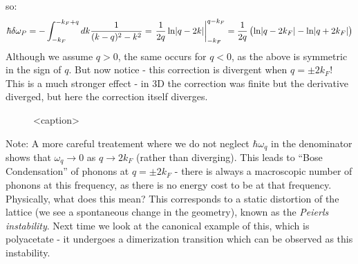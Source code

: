 so:
\begin{equation}
    \hbar \delta \omega_P =  -\int_{-k_F}^{-k_F + q}dk \frac{1}{(k - q)^2 - k^2} = \left.\frac{1}{2q}\ln\lvert q - 2k \rvert\right|_{-k_F}^{q - k_F} = \frac{1}{2q}\left(\ln\lvert q - 2k_F \rvert - \ln\lvert q + 2k_F \rvert\right)
\end{equation}
Although we assume $q > 0$, the same occurs for $q < 0$, as the above is symmetric in the sign of $q$. But now notice - this correction is divergent when $q = \pm 2k_F$! This is a much stronger effect - in 3D the correction was finite but the derivative diverged, but here the correction itself diverges.

\begin{figure}[htbp]
    \centering
    
    \caption{<caption>}
    \label{<label>}
\end{figure}

Note: A more careful treatement where we do not neglect $\hbar \omega_q$ in the denominator shows that $\omega_q \to 0$ as $q \to 2k_F$ (rather than diverging). This leads to ``Bose Condensation'' of phonons at $q = \pm 2k_F$ - there is always a macroscopic number of phonons at this frequency, as there is no energy cost to be at that frequency. Physically, what does this mean? This corresponds to a static distortion of the lattice (we see a spontaneous change in the geometry), known as the \emph{Peierls instability}. Next time we look at the canonical example of this, which is polyacetate - it undergoes a dimerization transition which can be observed as this instability.